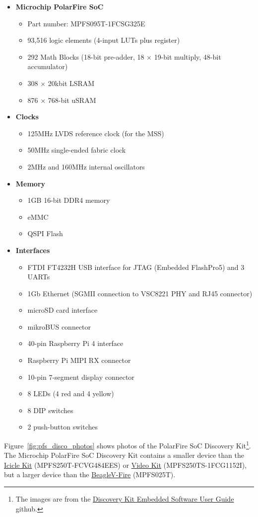 \begin{itemize}
%
\item \textbf{Microchip PolarFire SoC}~\cite{Microchip_PFSoC_DS_2025}
\begin{itemize}
\item Part number: MPFS095T-1FCSG325E
\item 93,516 logic elements (4-input LUTs plus register)
\item 292 Math Blocks (18-bit pre-adder, 18 $\times$ 19-bit multiply, 48-bit accumulator)
\item 308 $\times$ 20kbit LSRAM
\item 876 $\times$ 768-bit uSRAM
\end{itemize}
%
\item \textbf{Clocks}
\begin{itemize}
\item 125MHz LVDS reference clock (for the MSS)
\item 50MHz single-ended fabric clock
\item 2MHz and 160MHz internal oscillators
\end{itemize}
%
\item \textbf{Memory}
\begin{itemize}
\item 1GB 16-bit DDR4 memory
\item eMMC
\item QSPI Flash
\end{itemize}
%
\item \textbf{Interfaces}
\begin{itemize}
\item FTDI FT4232H USB interface for JTAG (Embedded FlashPro5) and 3 UARTs
\item 1Gb Ethernet (SGMII connection to VSC8221 PHY and RJ45 connector)
\item microSD card interface
\item mikroBUS connector
\item 40-pin Raspberry Pi 4 interface
\item Raspberry Pi MIPI RX connector
\item 10-pin 7-segment display connector
\item 8 LEDs (4 red and 4 yellow)
\item 8 DIP switches
\item 2 push-button switches
\end{itemize}
%
\end{itemize}
%
Figure~\ref{fig:pfs_disco_photos} shows photos of the PolarFire SoC
Discovery Kit\footnote{The images are from the
\href{https://github.com/polarfire-soc/polarfire-soc-documentation/blob/master/reference-designs-fpga-and-development-kits/mpfs-discovery-kit-embedded-software-user-guide.md}
{Discovery Kit Embedded Software User Guide} github.}.
%
The Microchip PolarFire SoC Discovery Kit contains a smaller device than the
\href{https://www.microchip.com/en-us/development-tool/mpfs-icicle-kit-es}
{Icicle Kit} (MPFS250T-FCVG484EES) or
\href{https://www.microchip.com/en-us/development-tool/MPFS250-VIDEO-KIT}
{Video Kit} (MPFS250TS-1FCG1152I), but a larger device than the
\href{https://www.beagleboard.org/boards/beaglev-fire}{BeagleV-Fire} (MPFS025T).


